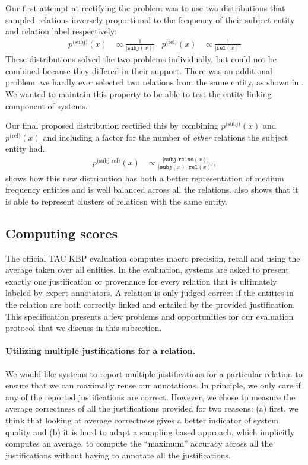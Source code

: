 Our first attempt at rectifying the problem was to use two distributions that sampled relations inversely proportional to the frequency of their subject entity and relation label respectively:
\begin{align*}
  p^{\text{(subj)}}(x) &\propto \frac{1}{|\texttt{subj}(x)|} &
  p^{\text{(rel)}}(x) &\propto \frac{1}{|\texttt{rel}(x)|}
\end{align*}
These distributions solved the two problems individually, but could not be combined because they differed in their support.
There was an additional problem: we hardly ever selected two relations from the same entity, as shown in .
We wanted to maintain this property to be able to test the entity linking component of systems.

Our final proposed distribution rectified this by combining $p^{\text{(subj)}}(x)$ and $p^{\text{(rel)}}(x)$ and including a factor for the number of \textit{other} relations the subject entity had.
\begin{align*}
  p^{\text{(subj-rel)}}(x) &\propto \frac{|\texttt{subj-relns}(x)|}{|\texttt{subj}(x)| |\texttt{rel}(x)|},
\end{align*}
 shows how this new distribution has both a better representation of medium frequency entities and is well balanced across all the relations.
 also shows that it is able to represent clusters of relatiosn with the same entity.

\subsection{Computing scores}

The official TAC KBP evaluation computes macro precision, recall and \fone{} using the average taken over all entities.
In the evaluation, systems are asked to present exactly one justification or provenance for every relation that is ultimately labeled by expert annotators.  
A relation is only judged correct if the entities in the relation are both correctly linked and entailed by the provided justification.
This specification presents a few problems and opportunities for our evaluation protocol that we discuss in this subsection. 

\paragraph{Utilizing multiple justifications for a relation.}
We would like systems to report multiple justifications for a particular relation to ensure that we can maximally reuse our annotations.
In principle, we only care if any of the reported justifications are correct.
However, we chose to measure the average correctness of all the justifications provided for two reasons:
  (a) first, we think that looking at average correctness gives a better indicator of system quality and 
  (b) it is hard to adapt a sampling based approach, which implicitly computes an average, to compute the ``maximum'' accuracy across all the justifications without having to annotate all the justifications.

